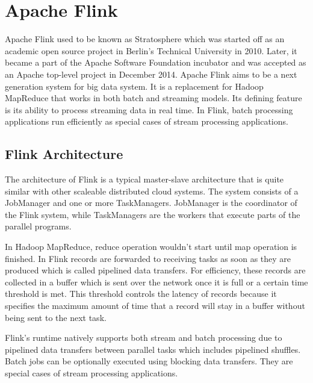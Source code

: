 \section{Apache Flink}
Apache Flink used to be known as Stratosphere which was started off as an academic open source project in Berlin's Technical University in 2010. Later, it became a part of the Apache Software Foundation incubator and was accepted as an Apache top-level project in December 2014. Apache Flink aims to be a next generation system for big data system. It is a replacement for Hadoop MapReduce that works in both batch and streaming models. Its defining feature is its ability to process streaming data in real time. In Flink, batch processing applications run efficiently as special cases of stream processing applications.

\subsection{Flink Architecture}
The architecture of Flink is a typical master-slave architecture that is quite similar with other scaleable distributed cloud systems. The system consists of a JobManager and one or more TaskManagers. JobManager is the coordinator of the Flink system, while TaskManagers are the workers that execute parts of the parallel programs. 

In Hadoop MapReduce, reduce operation wouldn't start until map operation is finished. In Flink records are forwarded to receiving tasks as soon as they are produced which is called pipelined data transfers. For efficiency, these records are collected in a buffer which is sent over the network once it is full or a certain time threshold is met. This threshold controls the latency of records because it specifies the maximum amount of time that a record will stay in a buffer without being sent to the next task. 

Flink's runtime natively supports both stream and batch processing due to pipelined data transfers between parallel tasks which includes pipelined shuffles. Batch jobs can be optionally executed using blocking data transfers. They are special cases of stream processing applications.


